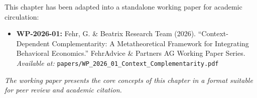 \begin{tcolorbox}[colback=purple!5!white, colframe=purple!75!black,
    title=\textbf{Related Publications}]
\small

This chapter has been adapted into a standalone working paper for academic circulation:

\begin{itemize}[nosep]
    \item \textbf{WP-2026-01:} Fehr, G. \& Beatrix Research Team (2026). ``Context-Dependent Complementarity: A Metatheoretical Framework for Integrating Behavioral Economics.'' FehrAdvice \& Partners AG Working Paper Series. \\
    \textit{Available at:} \texttt{papers/WP\_2026\_01\_Context\_Complementarity.pdf}
\end{itemize}

\textit{The working paper presents the core concepts of this chapter in a format suitable for peer review and academic citation.}
\end{tcolorbox}

\vspace{1em}

